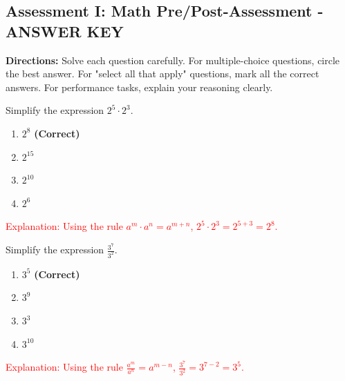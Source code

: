 \documentclass[12pt]{article}
\begin{document}
\subsection*{Assessment I: Math Pre/Post-Assessment - ANSWER KEY}
\onehalfspacing

\begin{tcolorbox}[colframe=black!50, colback=white, title=Assessment Directions]
\textbf{Directions:} Solve each question carefully. For multiple-choice questions, circle the best answer. For "select all that apply" questions, mark all the correct answers. For performance tasks, explain your reasoning clearly.
\end{tcolorbox}

\begin{tcolorbox}[colframe=black!50, colback=white, title=\textbf{Problem 1 (8.EE.A.1)}]
Simplify the expression \(2^5 \cdot 2^3\).

\begin{enumerate}[label=(\Alph*)]
    \item \(2^8\) \textbf{(Correct)}  
    \item \(2^{15}\)  
    \item \(2^{10}\)  
    \item \(2^6\)
\end{enumerate}
\textcolor{red}{Explanation: Using the rule \(a^m \cdot a^n = a^{m+n}\), \(2^5 \cdot 2^3 = 2^{5+3} = 2^8\).}
\end{tcolorbox}

\begin{tcolorbox}[colframe=black!50, colback=white, title=\textbf{Problem 2 (8.EE.A.1)}]
Simplify the expression \(\frac{3^7}{3^2}\).

\begin{enumerate}[label=(\Alph*)]
    \item \(3^5\) \textbf{(Correct)}  
    \item \(3^9\)  
    \item \(3^3\)  
    \item \(3^{10}\)
\end{enumerate}
\textcolor{red}{Explanation: Using the rule \(\frac{a^m}{a^n} = a^{m-n}\), \(\frac{3^7}{3^2} = 3^{7-2} = 3^5\).}
\end{tcolorbox}
\end{document}
